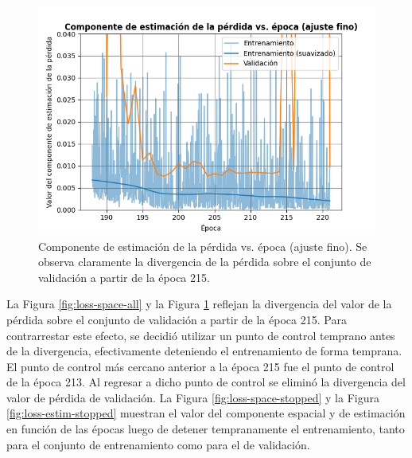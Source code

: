\begin{figure}[H]
    \centering
    \includegraphics[scale=0.6]{partes/img/loss-estim-all.png}
    \caption[Componente de estimación de la pérdida vs. época (ajuste fino).]{Componente de estimación de la pérdida vs. época (ajuste fino). Se observa claramente la divergencia de la pérdida sobre el conjunto de validación a partir de la época 215.}
    \label{fig:loss-estim-all}
\end{figure}

La Figura \ref{fig:loss-space-all} y la Figura \ref{fig:loss-estim-all} reflejan la divergencia del valor de la pérdida sobre el conjunto de validación a partir de la época 215. Para contrarrestar este efecto, se decidió utilizar un punto de control temprano antes de la divergencia, efectivamente deteniendo el entrenamiento de forma temprana. El punto de control más cercano anterior a la época 215 fue el punto de control de la época 213. Al regresar a dicho punto de control se eliminó la divergencia del valor de pérdida de validación. La Figura \ref{fig:loss-space-stopped} y la Figura \ref{fig:loss-estim-stopped} muestran el valor del componente espacial y de estimación en función de las épocas luego de detener tempranamente el entrenamiento, tanto para el conjunto de entrenamiento como para el de validación. 

